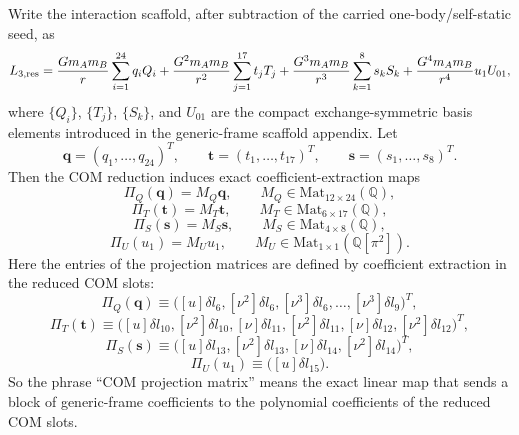 \documentclass[11pt]{article}
\begin{document}
Write the interaction scaffold, after subtraction of the carried one-body/self-static
seed, as
\begin{equation}
L_{3,\rm res}
=
\frac{Gm_A m_B}{r}\sum_{i=1}^{24} q_i Q_i
+\frac{G^2m_A m_B}{r^2}\sum_{j=1}^{17} t_j T_j
+\frac{G^3m_A m_B}{r^3}\sum_{k=1}^{8} s_k S_k
+\frac{G^4m_A m_B}{r^4}u_1 U_{01},
\label{eq:app-com-proj-residual-scaffold}
\end{equation}
where $\{Q_i\}$, $\{T_j\}$, $\{S_k\}$, and $U_{01}$ are the compact
exchange-symmetric basis elements introduced in the generic-frame scaffold
appendix.  Let
\begin{equation}
\mathbf q=(q_1,\dots,q_{24})^T,
\qquad
\mathbf t=(t_1,\dots,t_{17})^T,
\qquad
\mathbf s=(s_1,\dots,s_8)^T.
\label{eq:app-com-proj-coefficient-vectors}
\end{equation}
Then the COM reduction induces exact coefficient-extraction maps
\begin{equation}
\Pi_Q(\mathbf q)=M_Q\mathbf q,
\qquad
M_Q\in\mathrm{Mat}_{12\times24}(\mathbb Q),
\label{eq:app-com-proj-MQ}
\end{equation}
\begin{equation}
\Pi_T(\mathbf t)=M_T\mathbf t,
\qquad
M_T\in\mathrm{Mat}_{6\times17}(\mathbb Q),
\label{eq:app-com-proj-MT}
\end{equation}
\begin{equation}
\Pi_S(\mathbf s)=M_S\mathbf s,
\qquad
M_S\in\mathrm{Mat}_{4\times8}(\mathbb Q),
\label{eq:app-com-proj-MS}
\end{equation}
\begin{equation}
\Pi_U(u_1)=M_U u_1,
\qquad
M_U\in\mathrm{Mat}_{1\times1}(\mathbb Q[\pi^2]).
\label{eq:app-com-proj-MU}
\end{equation}
Here the entries of the projection matrices are defined by coefficient extraction
in the reduced COM slots:
\begin{equation}
\Pi_Q(\mathbf q)
\equiv
\bigl([
u]\delta l_6,[\nu^2]\delta l_6,[\nu^3]\delta l_6,\dots,[\nu^3]\delta l_9\bigr)^T,
\label{eq:app-com-proj-PiQ}
\end{equation}
\begin{equation}
\Pi_T(\mathbf t)
\equiv
\bigl([
u]\delta l_{10},[\nu^2]\delta l_{10},[\nu]\delta l_{11},[\nu^2]\delta l_{11},[\nu]\delta l_{12},[\nu^2]\delta l_{12}\bigr)^T,
\label{eq:app-com-proj-PiT}
\end{equation}
\begin{equation}
\Pi_S(\mathbf s)
\equiv
\bigl([
u]\delta l_{13},[\nu^2]\delta l_{13},[\nu]\delta l_{14},[\nu^2]\delta l_{14}\bigr)^T,
\label{eq:app-com-proj-PiS}
\end{equation}
\begin{equation}
\Pi_U(u_1)
\equiv
\bigl([
u]\delta l_{15}\bigr).
\label{eq:app-com-proj-PiU}
\end{equation}
So the phrase ``COM projection matrix'' means the exact linear map that sends a
block of generic-frame coefficients to the polynomial coefficients of the
reduced COM slots.
\end{document}
